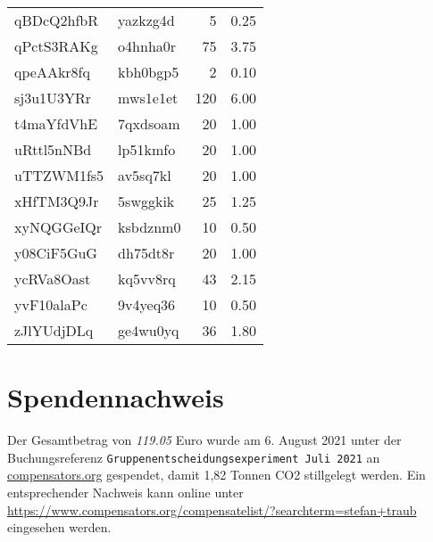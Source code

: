 \documentclass[]{elsarticle} %
\begin{document}
\begin{longtable}{llrr}
qBDcQ2hfbR & yazkzg4d & 5 & 0.25\\
qPctS3RAKg & o4hnha0r & 75 & 3.75\\
qpeAAkr8fq & kbh0bgp5 & 2 & 0.10\\
\addlinespace
sj3u1U3YRr & mws1e1et & 120 & 6.00\\
t4maYfdVhE & 7qxdsoam & 20 & 1.00\\
uRttl5nNBd & lp51kmfo & 20 & 1.00\\
uTTZWM1fs5 & av5sq7kl & 20 & 1.00\\
xHfTM3Q9Jr & 5swggkik & 25 & 1.25\\
\addlinespace
xyNQGGeIQr & ksbdznm0 & 10 & 0.50\\
y08CiF5GuG & dh75dt8r & 20 & 1.00\\
ycRVa8Oast & kq5vv8rq & 43 & 2.15\\
yvF10alaPc & 9v4yeq36 & 10 & 0.50\\
zJlYUdjDLq & ge4wu0yq & 36 & 1.80\\*
\end{longtable}
\endgroup{}

\hypertarget{spendennachweis}{%
\section{Spendennachweis}\label{spendennachweis}}

Der Gesamtbetrag von \emph{119.05} Euro wurde am 6. August 2021 unter
der Buchungsreferenz \texttt{Gruppenentscheidungsexperiment\ Juli\ 2021}
an \url{compensators.org} gespendet, damit 1,82 Tonnen CO2 stillgelegt
werden. Ein entsprechender Nachweis kann online unter
\url{https://www.compensators.org/compensatelist/?searchterm=stefan+traub}
eingesehen werden.


\end{document}
